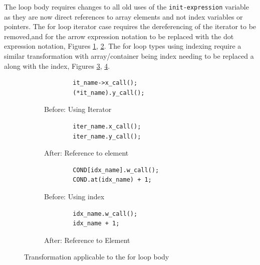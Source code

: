 \documentclass[bsc,frontabs,singlespacing,parskip,deptreport]{infthesis}
\begin{document}
The loop body requires changes to all old uses of the \texttt{init-expression} variable as they are now direct references to array elements and not index variables or pointers. The for loop iterator case requires the dereferencing of the iterator to be removed,and for the arrow expression notation to be replaced with the dot expression notation, Figures \ref{fig:before-tran-iter}, \ref{fig:after-tran-iter}. The for loop types using indexing require a similar transformation with array/container being index needing to be replaced a along with the index, Figures \ref{fig:before-tran-idx}, \ref{fig:after-tran-idx}.

\begin{figure}[H]
    \centering
  \begin{subfigure}[t]{0.45\textwidth}
        \centering
        \begin{verbatim}
        it_name->x_call();
        (*it_name).y_call();
        \end{verbatim}
        \caption{Before: Using Iterator}
        \label{fig:before-tran-iter}
        \vspace{0.40cm}
    \end{subfigure}
    \hfill
    \begin{subfigure}[t]{0.45\textwidth}
        \begin{verbatim}
        iter_name.x_call();
        iter_name.y_call();
        \end{verbatim}
        \caption{After: Reference to element}
        \centering
        \label{fig:after-tran-iter}
    \end{subfigure}
    
     \begin{subfigure}[t]{0.45\textwidth}
        \centering
        \begin{verbatim}
        COND[idx_name].w_call();
        COND.at(idx_name) + 1;
        \end{verbatim}
        \caption{Before: Using index}
        \label{fig:before-tran-idx}
        \vspace{0.40cm}
    \end{subfigure}
    \hfill
    \begin{subfigure}[t]{0.45\textwidth}
        \begin{verbatim}
        idx_name.w_call();
        idx_name + 1;
        \end{verbatim}
        \caption{After: Reference to Element}
        \centering
        \label{fig:after-tran-idx}
    \end{subfigure}

    \caption{Transformation applicable to the for loop body}
    \label{fig:code-trans-loop-body}
\end{figure}
\end{document}
